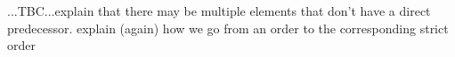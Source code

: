 
...TBC...explain that there may be multiple elements that don't have a direct predecessor. explain (again) how we go from an order to the corresponding strict order








